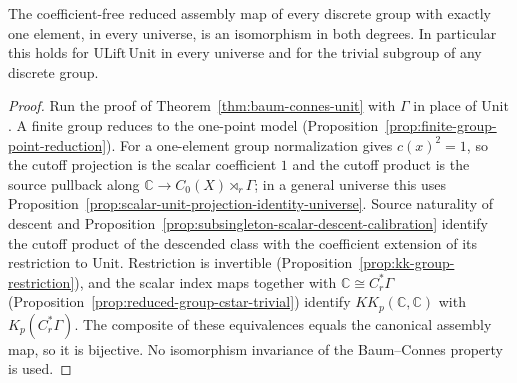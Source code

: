 \begin{theorem}\label{thm:baum-connes-subsingleton}
\leanok
The coefficient-free reduced assembly map of every discrete group with exactly
one element, in every universe, is an isomorphism in both degrees. In
particular this holds for $\mathrm{ULift}\,\mathrm{Unit}$ in every universe and
for the trivial subgroup of any discrete group.
\end{theorem}
\begin{proof}
\leanok
Run the proof of Theorem~\ref{thm:baum-connes-unit} with $\Gamma$ in place of
$\mathrm{Unit}$. A finite group reduces to the one-point model
(Proposition~\ref{prop:finite-group-point-reduction}). For a one-element group
normalization gives $c(x)^2=1$, so the cutoff projection is the scalar
coefficient $1$ and the cutoff product is the source pullback along
$\mathbb C\to C_0(X)\rtimes_r\Gamma$; in a general universe this uses
Proposition~\ref{prop:scalar-unit-projection-identity-universe}. Source
naturality of descent and
Proposition~\ref{prop:subsingleton-scalar-descent-calibration} identify the
cutoff product of the descended class with the coefficient extension of its
restriction to $\mathrm{Unit}$. Restriction is invertible
(Proposition~\ref{prop:kk-group-restriction}), and the scalar index maps
together with $\mathbb C\cong C^*_r\Gamma$
(Proposition~\ref{prop:reduced-group-cstar-trivial}) identify
$KK_p(\mathbb C,\mathbb C)$ with $K_p(C^*_r\Gamma)$. The composite of these
equivalences equals the canonical assembly map, so it is bijective. No
isomorphism invariance of the Baum--Connes property is used.
\end{proof}

